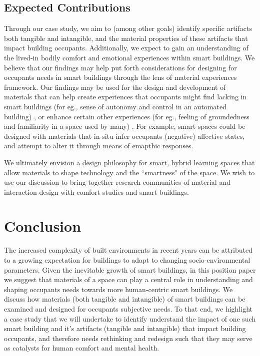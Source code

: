 \documentclass[manuscript, anonymous, review]{acmart}
\begin{document}
\subsection{Expected Contributions}
Through our case study, we aim to (among other goals) identify specific artifacts both tangible and intangible, and the material properties of these artifacts that impact building occupants. Additionally, we expect to gain an understanding of the lived-in bodily comfort and emotional experiences within smart buildings. We believe that our findings may help put forth considerations for designing for occupants needs in smart buildings through the lens of material experiences framework. Our findings may be used for the design and development of materials that can help create experiences that occupants might find lacking in smart buildings (for eg., sense of autonomy and control in an automated building) \cite{moreno2014user}, or enhance certain other experiences (for eg., feeling of groundedness and familiarity in a space used by many) \cite{rehman2022personalisedcomfort}.  For example, smart spaces could be designed with materials that in-situ infer occupants (negative) affective states, and attempt to alter it through means of emapthic responses. 

We ultimately envision a design philosophy for smart, hybrid learning spaces that allow materials to shape technology and the ``smartness" of the space. We wish to use our discussion to bring together research communities of material and interaction design with comfort studies and smart buildings.


\section{Conclusion}
The increased complexity of built environments in recent years can be attributed to a growing expectation for buildings to adapt to changing socio-environmental parameters. Given the inevitable growth of smart buildings, in this position paper we suggest that materials of a space can play a central role in understanding and shaping occupants needs towards more human-centric smart buildings. We discuss how materials (both tangible and intangible) of smart buildings can be examined and designed for occupants subjective needs. To that end, we highlight a case study that we will undertake to identify understand the impact of one such smart building and it's artifacts (tangible and intangible) that impact building occupants, and therefore needs rethinking and  redesign such that they may serve as catalysts for human comfort and mental health. 




\end{document}
